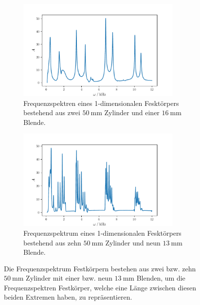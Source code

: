 \begin{figure}
    \begin{subfigure}{0.48\textwidth}%
    \centering%
    \includegraphics[height=5cm]{build/2c1b.pdf}%
    \caption{Frequenzspektren eines 1-dimensionalen Fesktörpers bestehend aus zwei $\qty{50}{\milli\meter}$ Zylinder und einer $\qty{16}{\milli\meter}$ Blende.}%
    \label{fig:2c1b}%
    \end{subfigure}%
    \hfill%
    \begin{subfigure}{0.48\textwidth}%
    \centering%
    \includegraphics[height=5cm]{build/10c9b.pdf}%
    \caption{Frequenzspektrum eines 1-dimensionalen Fesktörpers bestehend aus zehn $\qty{50}{\milli\meter}$ Zylinder und neun $\qty{13}{\milli\meter}$ Blende.}%
    \label{fig:2c1b}%
    \end{subfigure}%
    \caption{Die Frequenzspektrum Festkörpern bestehen aus zwei bzw. zehn $\qty{50}{\milli\meter}$ Zylinder mit einer bzw. neun $\qty{13}{\milli\meter}$ Blenden, um die 
    Frequenzspektren Festkörper, welche eine Länge zwischen diesen beiden Extremen haben, zu repräsentieren.}%
    \label{fig:13mm}
\end{figure}%
